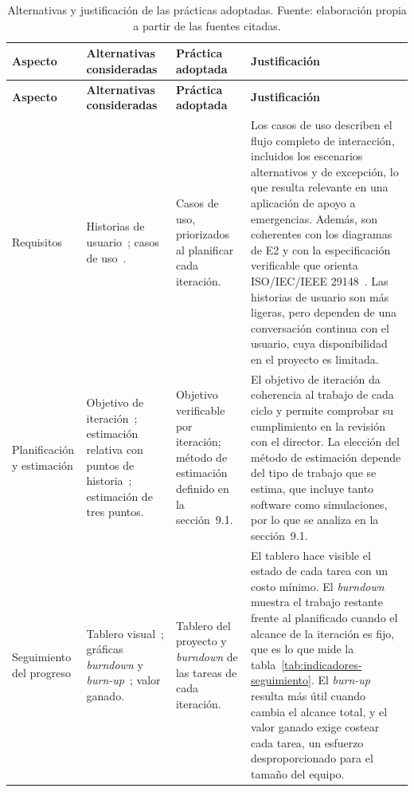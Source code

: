 \begin{longtable}{|p{}|p{}|p{}|p{}|}
\caption{Alternativas y justificación de las prácticas adoptadas. Fuente: elaboración propia a partir de las fuentes citadas.}\label{tab:alternativas-practicas}\\
\hline
\textbf{Aspecto} & \textbf{Alternativas consideradas} & \textbf{Práctica adoptada} & \textbf{Justificación}\tabularnewline\hline
\endfirsthead
\hline
\textbf{Aspecto} & \textbf{Alternativas consideradas} & \textbf{Práctica adoptada} & \textbf{Justificación}\tabularnewline\hline
\endhead
\raggedright Requisitos & \raggedright Historias de usuario~\cite{cohn2004stories}; casos de uso~\cite{cockburn2001usecases}. & \raggedright Casos de uso, priorizados al planificar cada iteración. & Los casos de uso describen el flujo completo de interacción, incluidos los escenarios alternativos y de excepción, lo que resulta relevante en una aplicación de apoyo a emergencias. Además, son coherentes con los diagramas de E2 y con la especificación verificable que orienta ISO/IEC/IEEE 29148~\cite{std29148}. Las historias de usuario son más ligeras, pero dependen de una conversación continua con el usuario, cuya disponibilidad en el proyecto es limitada.\tabularnewline\hline
\raggedright Planificación y estimación & \raggedright Objetivo de iteración~\cite{scrumguide2020}; estimación relativa con puntos de historia~\cite{cohn2005estimating}; estimación de tres puntos. & \raggedright Objetivo verificable por iteración; método de estimación definido en la sección~9.1. & El objetivo de iteración da coherencia al trabajo de cada ciclo y permite comprobar su cumplimiento en la revisión con el director. La elección del método de estimación depende del tipo de trabajo que se estima, que incluye tanto software como simulaciones, por lo que se analiza en la sección~9.1.\tabularnewline\hline
\raggedright Seguimiento del progreso & \raggedright Tablero visual~\cite{anderson2010kanban}; gráficas \textit{burndown} y \textit{burn-up}~\cite{cohn2005estimating}; valor ganado. & \raggedright Tablero del proyecto y \textit{burndown} de las tareas de cada iteración. & El tablero hace visible el estado de cada tarea con un costo mínimo. El \textit{burndown} muestra el trabajo restante frente al planificado cuando el alcance de la iteración es fijo, que es lo que mide la tabla~\ref{tab:indicadores-seguimiento}. El \textit{burn-up} resulta más útil cuando cambia el alcance total, y el valor ganado exige costear cada tarea, un esfuerzo desproporcionado para el tamaño del equipo.\tabularnewline\hline

\end{longtable}
